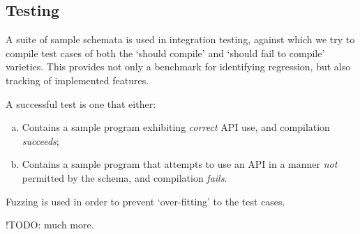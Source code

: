 \subsection{Testing} \label{impl:testing}

A suite of sample schemata is used in integration testing, against which we try to compile test cases of both the `should compile' and `should fail to compile' varieties. This provides not only a benchmark for identifying regression, but also tracking of implemented features.

A successful test is one that either:
\begin{enumerate}[(a)]
	\item Contains a sample program exhibiting \emph{correct} API use, and compilation \emph{succeeds};
	\item Contains a sample program that attempts to use an API in a manner \emph{not} permitted by the schema, and compilation \emph{fails}.
\end{enumerate}

Fuzzing is used in order to prevent `over-fitting' to the test cases.

!TODO: much more.